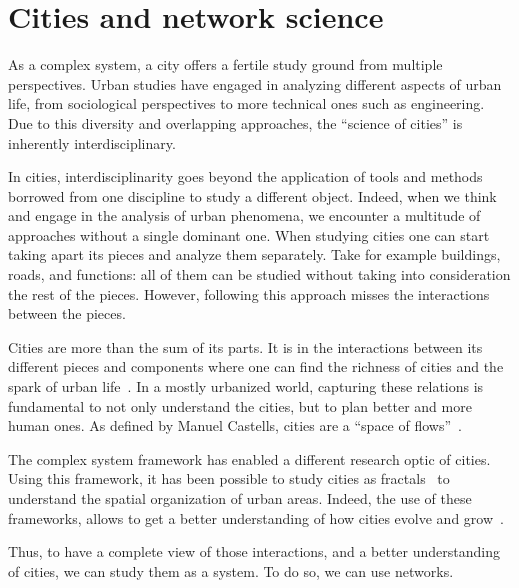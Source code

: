 \section{Cities and network science}


As a complex system, a city offers a fertile study ground from multiple perspectives. Urban studies have engaged in analyzing different aspects of urban life, from sociological perspectives to more technical ones such as engineering. Due to this diversity and overlapping approaches, the ``science of cities'' is inherently interdisciplinary.

In cities, interdisciplinarity goes beyond the application of tools and methods borrowed from one discipline to study a different object. Indeed, when we think and engage in the analysis of urban phenomena, we encounter a multitude of approaches without a single dominant one. When studying cities one can start taking apart its pieces and analyze them separately. Take for example buildings, roads, and functions: all of them can be studied without taking into consideration the rest of the pieces. However, following this approach misses the interactions between the pieces. 

Cities are more than the sum of its parts. It is in the interactions between its different pieces and components where one can find the richness of cities and the spark of urban life~\cite{Jacobs1961Death}. In a mostly urbanized world, capturing these relations is fundamental to not only understand the cities, but to plan better and more human ones. As defined by Manuel Castells, cities are a ``space of flows''~\cite{castells1989informational}. %

The complex system framework has enabled a different research optic of cities. Using this framework, it has been possible to study cities as fractals~\cite{batty1996preliminary} to understand the spatial organization of urban areas. Indeed, the use of these frameworks, allows to get a better understanding of how cities evolve and grow~\cite{makse1995growth}. %

Thus, to have a complete view of those interactions, and a better understanding of cities, we can study them as a system. To do so, we can use networks.

